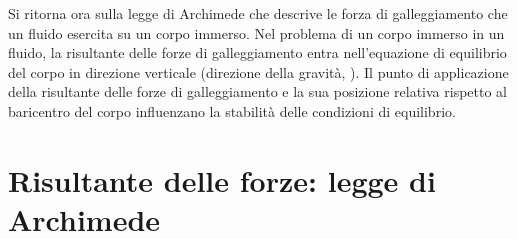 \documentclass[letterpaper,10pt,italian]{jupyterBook}
\begin{document}
\sphinxAtStartPar
Si ritorna ora sulla legge di Archimede che descrive le forza di
galleggiamento che un fluido esercita su un corpo immerso. Nel problema
di un corpo immerso in un fluido, la risultante delle forze di
galleggiamento entra nell’equazione di equilibrio del corpo in direzione
verticale (direzione della gravità, ). Il punto di applicazione
della risultante delle forze di galleggiamento e la sua posizione
relativa rispetto al baricentro del corpo influenzano la stabilità delle
condizioni di equilibrio.


\section{Risultante delle forze: legge di Archimede}
\label{\detokenize{polimi/fluidmechanics-ita/template/capitoli/01_statica/02teoria:risultante-delle-forze-legge-di-archimede}}
\end{document}
